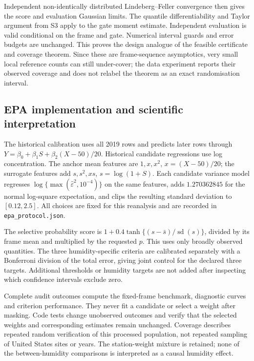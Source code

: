 Independent non-identically distributed Lindeberg--Feller convergence then gives the score and evaluation Gaussian limits. The quantile differentiability and Taylor argument from S3 apply to the gate moment estimate. Independent evaluation is valid conditional on the frame and gate. Numerical interval guards and error budgets are unchanged. This proves the design analogue of the feasible certificate and coverage theorem. Since these are frame-sequence asymptotics, very small local reference counts can still under-cover; the data experiment reports their observed coverage and does not relabel the theorem as an exact randomisation interval.

\subsection{EPA implementation and scientific interpretation}
The historical calibration uses all 2019 rows and predicts later rows through $Y=\beta_0+\beta_1S+\beta_2(X-50)/20$. Historical candidate regressions use log concentration. The anchor mean features are $1,x,x^2$, $x=(X-50)/20$; the surrogate features add $s,s^2,xs$, $s=\log(1+S)$. Each candidate variance model regresses $\log\{\max(\widehat\varepsilon^2,10^{-4})\}$ on the same features, adds $1.270362845$ for the normal log-square expectation, and clips the resulting standard deviation to $[0.12,2.5]$. All choices are fixed for this reanalysis and are recorded in \texttt{epa\_protocol.json}.

The selective probability score is $1+0.4\tanh\{(s-\bar s)/\operatorname{sd}(s)\}$, divided by its frame mean and multiplied by the requested $p$. This uses only broadly observed quantities. The three humidity-specific criteria are calibrated separately with a Bonferroni division of the total error, giving joint control for the declared three targets. Additional thresholds or humidity targets are not added after inspecting which confidence intervals exclude zero.

Complete audit outcomes compute the fixed-frame benchmark, diagnostic curves and criterion performance. They never fit a candidate or select a weight after masking. Code tests change unobserved outcomes and verify that the selected weights and corresponding estimates remain unchanged. Coverage describes repeated random verification of this processed population, not repeated sampling of United States sites or years. The station-weight mixture is retained; none of the between-humidity comparisons is interpreted as a causal humidity effect.

